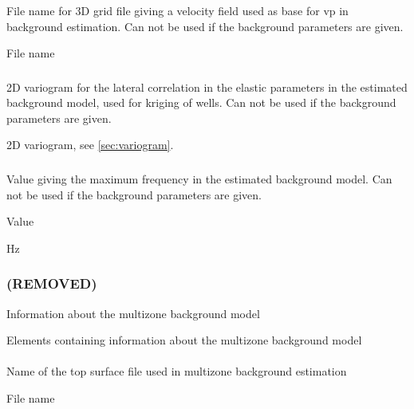 \subsubsection{}
 \slist
   \item \Description File name for 3D grid file giving a velocity field used as base for vp in background estimation. Can not be used if the background parameters are given.
   \item \Argument File name
   \item \Default
 \elist

\subsubsection{}
 \slist
   \item \Description 2D variogram for the lateral correlation in the elastic parameters in the estimated background model, used for kriging of wells. Can not be used if the background parameters are given.
   \item \Argument 2D variogram, see \autoref{sec:variogram}.
   \item \Default
 \elist

\subsubsection{}
 \slist
   \item \Description Value giving the maximum frequency in the estimated background model. Can not be used if the background parameters are given.
   \item \Argument Value
   \item {} Hz
 \elist

\subsubsection{ (REMOVED)}
 \slist
   \item \Description  Information about the multizone background model
   \item \Argument Elements containing information about the multizone background model
   \item \Default
 \elist

\paragraph{}
 \slist
   \item \Description Name of the top surface file used in multizone background estimation
   \item \Argument File name
   \item \Default
 \elist

